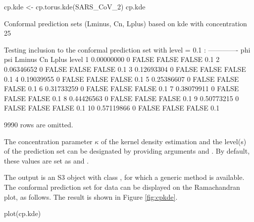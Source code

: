 \begin{example}
cp.kde <- cp.torus.kde(SARS_CoV_2)
cp.kde

Conformal prediction sets (Lminus, Cn, Lplus) based on kde with concentration 25

Testing inclusion to the conformal prediction set with level = 0.1 :
-------------
          phi psi Lminus    Cn Lplus level
1  0.00000000   0  FALSE FALSE FALSE   0.1
2  0.06346652   0  FALSE FALSE FALSE   0.1
3  0.12693304   0  FALSE FALSE FALSE   0.1
4  0.19039955   0  FALSE FALSE FALSE   0.1
5  0.25386607   0  FALSE FALSE FALSE   0.1
6  0.31733259   0  FALSE FALSE FALSE   0.1
7  0.38079911   0  FALSE FALSE FALSE   0.1
8  0.44426563   0  FALSE FALSE FALSE   0.1
9  0.50773215   0  FALSE FALSE FALSE   0.1
10 0.57119866   0  FALSE FALSE FALSE   0.1

 9990 rows are omitted.
\end{example}


The concentration parameter $\kappa$ of the kernel density estimation and the level(s) of the prediction set can be designated by providing arguments  and . By default, these values are set as  and .



The output  is an S3 object with class , for which a generic method  is available. The conformal prediction set for  data can be displayed on the Ramachandran plot, as follows. The result is shown in Figure \ref{fig:cpkde}.


\begin{example}
plot(cp.kde)
\end{example}

